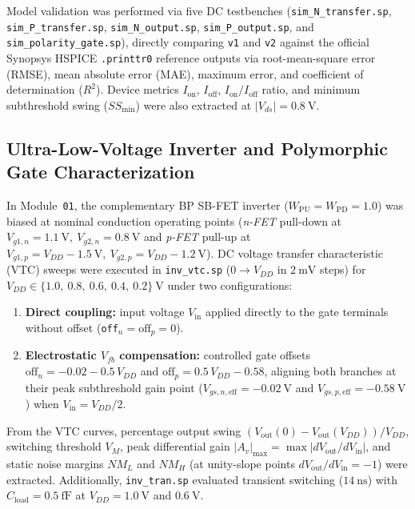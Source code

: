 Model validation was performed via five DC testbenches (\texttt{sim\_\allowbreak N\_\allowbreak transfer.sp}, \texttt{sim\_\allowbreak P\_\allowbreak transfer.sp}, \texttt{sim\_\allowbreak N\_\allowbreak output.sp}, \texttt{sim\_\allowbreak P\_\allowbreak output.sp}, and \texttt{sim\_\allowbreak polarity\_\allowbreak gate.sp}), directly comparing \texttt{v1} and \texttt{v2} against the official Synopsys HSPICE \texttt{.printtr0} reference outputs via root-mean-square error (RMSE), mean absolute error (MAE), maximum error, and coefficient of determination ($R^2$). Device metrics $I_{\mathrm{on}}$, $I_{\mathrm{off}}$, $I_{\mathrm{on}}/I_{\mathrm{off}}$ ratio, and minimum subthreshold swing ($SS_{\min}$) were also extracted at $|V_{ds}| = 0.8\ \text{V}$.

\subsection{Ultra-Low-Voltage Inverter and Polymorphic Gate Characterization}\label{sec:met_inv_poly}

In Module~\texttt{01}, the complementary BP SB-FET inverter ($W_{\mathrm{PU}} = W_{\mathrm{PD}} = 1.0$) was biased at nominal conduction operating points (\textit{n-FET} pull-down at $V_{g1,n} = 1.1\ \text{V},\ V_{g2,n} = 0.8\ \text{V}$ and \textit{p-FET} pull-up at $V_{g1,p} = V_{DD} - 1.5\ \text{V},\ V_{g2,p} = V_{DD} - 1.2\ \text{V}$). DC voltage transfer characteristic (VTC) sweeps were executed in \texttt{inv\_vtc.sp} ($0 \to V_{DD}$ in $2\ \text{mV}$ steps) for $V_{DD} \in \{1.0,\ 0.8,\ 0.6,\ 0.4,\ 0.2\}\ \text{V}$ under two configurations:
\begin{enumerate}
    \item \textbf{Direct coupling:} input voltage $V_{\mathrm{in}}$ applied directly to the gate terminals without offset (\texttt{off}$_n = \text{off}_p = 0$).
    \item \textbf{Electrostatic $V_{fb}$ compensation:} controlled gate offsets $\text{off}_n = -0.02 - 0.5\,V_{DD}$ and $\text{off}_p = 0.5\,V_{DD} - 0.58$, aligning both branches at their peak subthreshold gain point ($V_{gs,n,\mathrm{eff}} = -0.02\ \text{V}$ and $V_{gs,p,\mathrm{eff}} = -0.58\ \text{V}$) when $V_{\mathrm{in}} = V_{DD}/2$.
\end{enumerate}
From the VTC curves, percentage output swing $(V_{\mathrm{out}}(0)-V_{\mathrm{out}}(V_{DD}))/V_{DD}$, switching threshold $V_M$, peak differential gain $|A_v|_{\max} = \max|dV_{\mathrm{out}}/dV_{\mathrm{in}}|$, and static noise margins $NM_L$ and $NM_H$ (at unity-slope points $dV_{\mathrm{out}}/dV_{\mathrm{in}} = -1$) were extracted. Additionally, \texttt{inv\_tran.sp} evaluated transient switching ($14\ \text{ns}$) with $C_{\mathrm{load}} = 0.5\ \text{fF}$ at $V_{DD} = 1.0\ \text{V}$ and $0.6\ \text{V}$.


